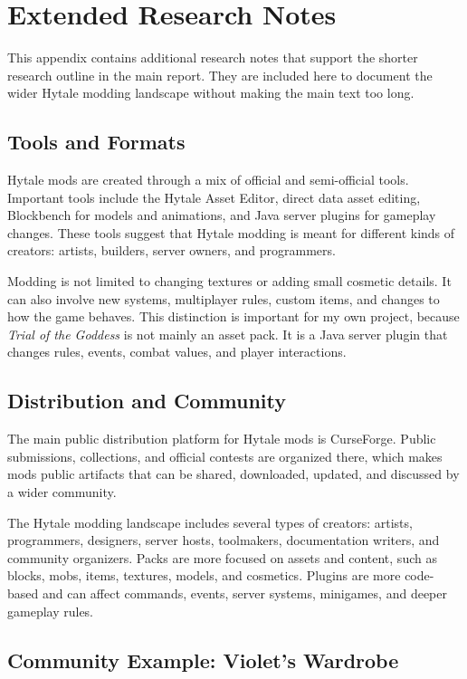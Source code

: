 \section{Extended Research Notes}
\label{app:research-notes}

This appendix contains additional research notes that support the shorter
research outline in the main report.
They are included here to document the wider Hytale modding landscape
without making the main text too long.

\subsection{Tools and Formats}

Hytale mods are created through a mix of official and semi-official tools.
Important tools include the Hytale Asset Editor,
direct data asset editing,
Blockbench for models and animations,
and Java server plugins for gameplay changes.
These tools suggest that Hytale modding is meant for different kinds of creators:
artists,
builders,
server owners,
and programmers.

Modding is not limited to changing textures or adding small cosmetic details.
It can also involve new systems,
multiplayer rules,
custom items,
and changes to how the game behaves.
This distinction is important for my own project,
because \textit{Trial of the Goddess} is not mainly an asset pack.
It is a Java server plugin that changes rules,
events,
combat values,
and player interactions.

\subsection{Distribution and Community}

The main public distribution platform for Hytale mods is CurseForge.
Public submissions,
collections,
and official contests are organized there,
which makes mods public artifacts that can be shared,
downloaded,
updated,
and discussed by a wider community.

The Hytale modding landscape includes several types of creators:
artists,
programmers,
designers,
server hosts,
toolmakers,
documentation writers,
and community organizers.
Packs are more focused on assets and content,
such as blocks,
mobs,
items,
textures,
models,
and cosmetics.
Plugins are more code-based and can affect commands,
events,
server systems,
minigames,
and deeper gameplay rules.

\subsection{Community Example: Violet's Wardrobe}

